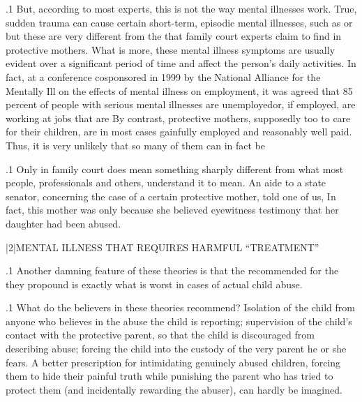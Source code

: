 \documentclass[11pt, twoside]{article}
\begin{document}
{\p.1{%
But, according to most experts, this is not the way mental illnesses
work. True, sudden trauma can cause certain short-term, episodic mental illnesses, such as  or \mdash{}but these are very different from the  that
family court experts claim to find in protective mothers. What is more,
these mental illness symptoms are usually evident over a significant
period of time and affect the person’s daily activities.
In fact, at a conference cosponsored in 1999 by the National Alliance
for the Mentally Ill on the effects of mental illness on employment, it
was agreed that 85 percent of people with serious mental illnesses are
unemployed\mdash{}or, if employed, are working at jobs that are  By contrast, protective mothers, supposedly too  to
care for their children, are in most cases gainfully employed and reasonably well paid. Thus, it is very unlikely that so many of them can in fact
be 
}%

\p.1{%
Only in family court does  mean something sharply
different from what most people, professionals and others, understand
it to mean. An aide to a state senator, concerning the case of a certain protective mother, told one of us,  In fact, this mother was  only because she believed eyewitness testimony that her daughter had been
abused.
}%


\s|2|{MENTAL ILLNESS THAT REQUIRES HARMFUL ``TREATMENT''}

\p.1{%
\noindent{}Another damning feature of these theories is that the  recommended for the  they propound is exactly what is worst in
cases of actual child abuse.
}%

\p.1{%
What do the believers in these theories recommend? Isolation of the
child from anyone who believes in the abuse the child is reporting; supervision of the child’s contact with the protective parent, so that the
child is discouraged from describing abuse; forcing the child into the
custody of the very parent he or she fears. A better prescription for intimidating genuinely abused children, forcing them to hide their painful
truth while punishing the parent who has tried to protect them (and
incidentally rewarding the abuser), can hardly be imagined.
}%

}
\end{document}
